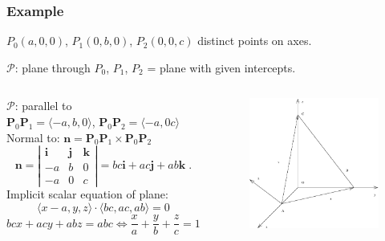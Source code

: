 \begin{frame}
 \frametitle{Example}

$P_0(a,0,0)$, $P_1(0,b,0)$, $P_2(0,0,c)$ distinct points on axes.

$\mathcal{P}$: plane through $P_0$, $P_1$, $P_2$ = plane with given intercepts.

\bigskip

\begin{columns}
  \column{7cm}
  $\mathcal{P}$: parallel to \\
  $\textbf{P}_0\textbf{P}_1 = \langle -a, b, 0\rangle$,
    $\textbf{P}_0\textbf{P}_2 = \langle -a, 0 c\rangle$\\
    Normal to:
$\textbf{n} = \textbf{P}_0\textbf{P}_1 \times \textbf{P}_0\textbf{P}_2$
$$\textbf{n} =
\left| \begin{array}{ccc}
        \textbf{i} & \textbf{j} & \textbf{k} \\
	-a & b & 0 \\
        -a & 0 & c
       \end{array}
 \right| = bc \textbf{i} + ac \textbf{j} + ab \textbf{k}\; .$$
Implicit scalar equation of plane:
%
$$\langle x-a, y, z \rangle \cdot \langle bc, ac, ab \rangle = 0$$
%
$$bcx+acy + abz = abc \Longleftrightarrow \boxed{\frac{x}{a} + \frac{y}{b} + \frac{z}{c} = 1}$$
  \column{5.5cm}
     \begin{figure}
        \includegraphics[width=2in]{../../modules/vectors/pictures/ok-plane_intercepts.eps}
    \end{figure}
\end{columns}
\end{frame}